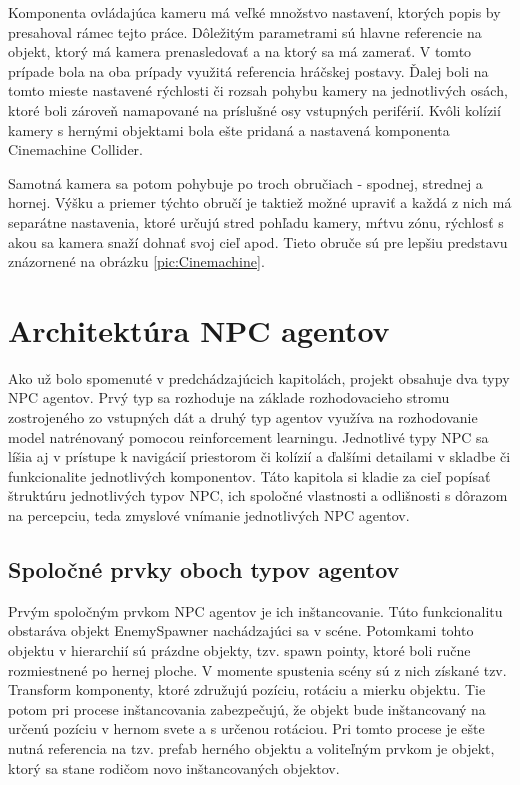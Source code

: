 \documentclass[slovak, master]{diploma}
\begin{document}
Komponenta ovládajúca kameru má veľké množstvo nastavení, ktorých popis by presahoval rámec tejto práce. Dôležitým parametrami sú hlavne referencie na objekt, ktorý má kamera prenasledovať a na ktorý sa má zamerať. V tomto prípade bola na oba prípady využitá referencia hráčskej postavy. Ďalej boli na tomto mieste nastavené rýchlosti či rozsah pohybu kamery na jednotlivých osách, ktoré boli zároveň namapované na príslušné osy vstupných periférií. Kvôli kolízií kamery s hernými objektami bola ešte pridaná a nastavená komponenta Cinemachine Collider.

Samotná kamera sa potom pohybuje po troch obručiach - spodnej, strednej a hornej. Výšku a priemer týchto obručí je taktiež možné upraviť a každá z nich má separátne nastavenia, ktoré určujú stred pohľadu kamery, mŕtvu zónu, rýchlosť s akou sa kamera snaží dohnať svoj cieľ apod. Tieto obruče sú pre lepšiu predstavu znázornené na obrázku \ref{pic:Cinemachine}.

\chapter{Architektúra NPC agentov}
\label{sec:Agents}
Ako už bolo spomenuté v predchádzajúcich kapitolách, projekt obsahuje dva typy NPC agentov. Prvý typ sa rozhoduje na základe rozhodovacieho stromu zostrojeného zo vstupných dát a druhý typ agentov využíva na rozhodovanie model natrénovaný pomocou reinforcement learningu. Jednotlivé typy NPC sa líšia aj v prístupe k navigácií priestorom či kolízií a ďalšími detailami v skladbe či funkcionalite jednotlivých komponentov. Táto kapitola si kladie za cieľ popísať štruktúru jednotlivých typov NPC, ich spoločné vlastnosti a odlišnosti s dôrazom na percepciu, teda zmyslové vnímanie jednotlivých NPC agentov.

\section{Spoločné prvky oboch typov agentov}
\label{sec:AgentsBoth}

Prvým spoločným prvkom NPC agentov je ich inštancovanie. Túto funkcionalitu obstaráva objekt EnemySpawner nachádzajúci sa v scéne. Potomkami tohto objektu v hierarchií sú prázdne objekty, tzv. spawn pointy, ktoré boli ručne rozmiestnené po hernej ploche. V momente spustenia scény sú z nich získané tzv. Transform komponenty, ktoré združujú pozíciu, rotáciu a mierku objektu. Tie potom pri procese inštancovania zabezpečujú, že objekt bude inštancovaný na určenú pozíciu v hernom svete a s určenou rotáciou. Pri tomto procese je ešte nutná referencia na tzv. prefab herného objektu a voliteľným prvkom je objekt, ktorý sa stane rodičom novo inštancovaných objektov. 
\end{document}
